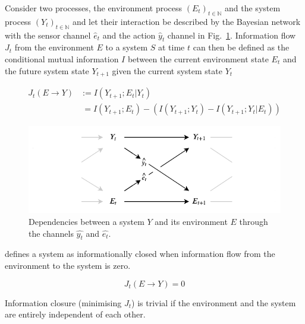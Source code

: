 \documentclass[utf8]{article}
\begin{document}
			Consider two processes, the environment process $(E_t)_{t \in \mathbb{N}}$ and the system process $(Y_t)_{t \in \mathbb{N}}$ and let their interaction be described by the Bayesian network with the sensor channel $\hat{e}_{t}$ and the action $\hat{y}_{t}$ channel in Fig.~\ref{fig:SystemAndEnv}. Information flow $J_{t}$ from the environment $E$ to a system $S$ at time $t$ can then be defined as the conditional mutual information $I$ between the current environment state $E_{t}$  and the future system state $Y_{t+1}$ given the current system state $Y_{t}$

				\begin{equation}
    				\label{eq:InformationFlow}
    				\left.\begin{array}
    				{rl}{J_{t}(E \rightarrow Y )} & {:= I(Y_{t+1};E_{t}|Y_{t})} \\
    				{ } & { \ = I(Y_{t+1};E_{t}) - (I(Y_{t+1};Y_{t})-I(Y_{t+1};Y_{t}|E_{t}))}
    				\end{array}\right.
				\end{equation}

            
				\begin{figure}
					\includegraphics[width=\textwidth]{Submission/Frontiers/SystemAndEnv_3.pdf}
					\caption{Dependencies between a system  $Y$ and its environment $E$ through the channels $\hat{y_t}$ and $\hat{e_t}$.} %
					\label{fig:SystemAndEnv}
				\end{figure}


			\noindent
			\cite{BERTSCHINGER.2006} defines a system as informationally closed when information flow from the environment to the system is zero.

				\begin{equation}
				J_{t}(E \rightarrow Y )=0
				\label{eq:informationflow2}
				\end{equation}


			\noindent
			Information closure (minimising $J_t$) is trivial if the environment and the system are entirely independent of each other.
\end{document}
